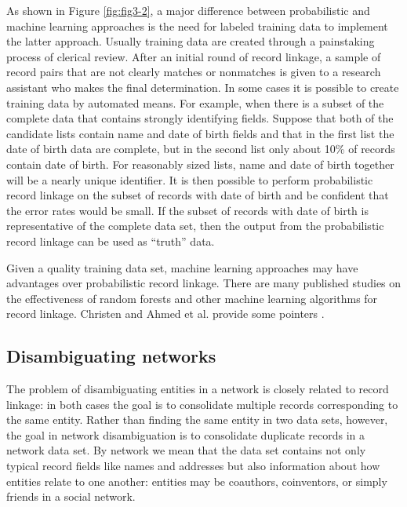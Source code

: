 \documentclass[]{krantz}
\begin{document}
As shown in Figure \ref{fig:fig3-2}, a major difference between
probabilistic and machine learning approaches is the need for labeled
training data to implement the latter approach. Usually training data
are created through a painstaking process of clerical review. After an
initial round of record linkage, a sample of record pairs that are not
clearly matches or nonmatches is given to a research assistant who makes
the final determination. In some cases it is possible to create training
data by automated means. For example, when there is a subset of the
complete data that contains strongly identifying fields. Suppose that
both of the candidate lists contain name and date of birth fields and
that in the first list the date of birth data are complete, but in the
second list only about 10\% of records contain date of birth. For
reasonably sized lists, name and date of birth together will be a nearly
unique identifier. It is then possible to perform probabilistic record
linkage on the subset of records with date of birth and be confident
that the error rates would be small. If the subset of records with date
of birth is representative of the complete data set, then the output
from the probabilistic record linkage can be used as ``truth'' data.

Given a quality training data set, machine learning approaches may have
advantages over probabilistic record linkage. There are many published
studies on the effectiveness of random forests and other machine
learning algorithms for record linkage. Christen and Ahmed et al.
provide some pointers
\citep{christen2012survey, elmagarmid2007duplicate}.

\subsection{Disambiguating networks}\label{disambiguating-networks}

The problem of disambiguating entities in a network is closely related
to record linkage: in both cases the goal is to consolidate multiple
records corresponding to the same entity. Rather than finding the same
entity in two data sets, however, the goal in network disambiguation is
to consolidate duplicate records in a network data set. By network we
mean that the data set contains not only typical record fields like
names and addresses but also information about how entities relate to
one another: entities may be coauthors, coinventors, or simply friends
in a social network.
\end{document}
